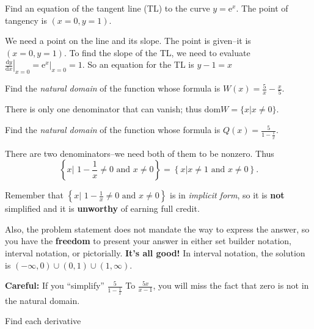\documentclass[12pt, answers,fleqn]{exam}
\newcommand{\dom}{\mbox{dom}}
\begin{document}
\begin{questions}
\begin{solution}
\end{solution}
\question Find an equation of the tangent line (TL) to the curve $y = \mathrm{e}^x$. 
The point of tangency is $(x= 0, y=1)$.
\begin{solution}
    We need a point on the line and its slope.  The point is given--it is \mbox{$(x= 0, y=1)$}.
    To find the slope of the TL, we need to evaluate $\displaystyle
    \left. \frac{\mathrm{d}y}{\mathrm{d}x} \right \vert_{x=0} = 
    \left. \mathrm{e}^x \right \vert_{x=0}  = 1.$ So an equation for the 
    TL is $y-1 = x$
    
\end{solution}

\question Find the \emph{natural domain} of the function whose formula is $W(x) = \frac{5}{x} - \frac{x}{5}$.
\begin{solution}
    There is only one denominator that can vanish; thus
    \(
     \dom{W} = \{x | x \neq 0 \}.
    \)
    
\end{solution}

\question Find the \emph{natural domain} of the function whose formula is 
$Q(x) = \frac{5}{1 - \frac{1}{x}} $.
\begin{solution}
    There are two denominators--we need both of them to be nonzero. Thus
    \[
         \left \{x |  \,\,  1 - \frac{1}{x} \neq 0 \mbox{ and } x \neq 0 \right \}
       =  \left \{x |   x \neq 1 \mbox{ and } x \neq 0 \right \}.
    \]

    Remember that \(\left \{x |  \,\,  1 - \frac{1}{x} \neq 0 \mbox{ and } x \neq 0  \right \} \)
    is in \emph{implicit form}, so it is \textbf{not} simplified and it
    is \textbf{unworthy} of earning full credit.

    \quad Also, the problem statement does not mandate the way to express 
    the answer, so you have the \textbf{freedom} to present your
    answer in either set builder notation, interval notation, or pictorially.
    \textbf{It's all good!} In interval notation, the solution is \((-\infty,0) \cup (0,1) \cup (1,\infty) \).


    \textbf{Careful:} If you ``simplify'' $\frac{5}{1 - \frac{1}{x}}$ To
    $\frac{5x}{x - 1}$, you will miss the fact that zero is 
    not in the natural domain.  
\end{solution}
\question Find each derivative

\end{questions}
\end{document}
